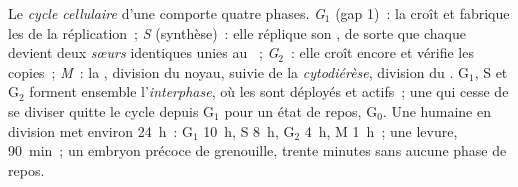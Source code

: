 \begin{definition}\label{def:b1:replication-mitosis:cycle}
Le \emph{cycle cellulaire} d'une  comporte quatre
phases. \emph{G$_1$} (gap 1)~: la  croît et fabrique les
 de la réplication~; \emph{S} (synthèse)~: elle réplique son ,
de sorte que chaque  devient deux \emph{ sœurs}
identiques unies au ~; \emph{G$_2$}~: elle croît encore et
vérifie les copies~; \emph{M}~: la \emph{}, division du noyau,
suivie de la \emph{cytodiérèse}, division du . G$_1$, S et
G$_2$ forment ensemble l'\emph{interphase}, où les  sont
déployés et actifs~; une  qui cesse de se diviser quitte le cycle
depuis G$_1$ pour un état de repos, G$_0$. Une  humaine en
division met environ \qty{24}{h}~: G$_1$ \qty{10}{h}, S \qty{8}{h},
G$_2$ \qty{4}{h}, M \qty{1}{h}~; une levure, \qty{90}{min}~; un embryon
précoce de grenouille, trente minutes sans aucune phase de repos.
\end{definition}

